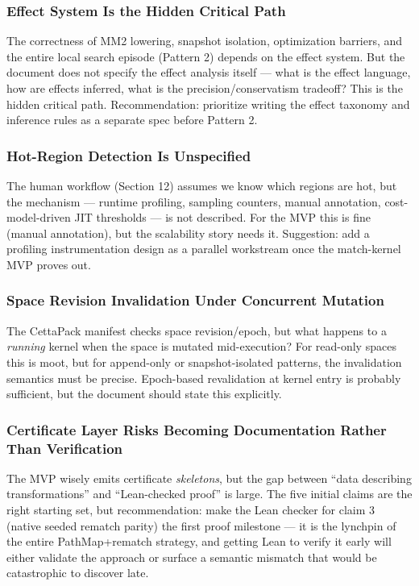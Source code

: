\documentclass[11pt]{article}
\begin{document}
\subsubsection{Effect System Is the Hidden Critical Path}

The correctness of MM2 lowering, snapshot isolation, optimization barriers, and the entire local search episode (Pattern 2) depends on the effect system. But the document does not specify the effect analysis itself --- what is the effect language, how are effects inferred, what is the precision/conservatism tradeoff? This is the hidden critical path. Recommendation: prioritize writing the effect taxonomy and inference rules as a separate spec before Pattern 2.

\subsubsection{Hot-Region Detection Is Unspecified}

The human workflow (Section 12) assumes we know which regions are hot, but the mechanism --- runtime profiling, sampling counters, manual annotation, cost-model-driven JIT thresholds --- is not described. For the MVP this is fine (manual annotation), but the scalability story needs it. Suggestion: add a profiling instrumentation design as a parallel workstream once the match-kernel MVP proves out.

\subsubsection{Space Revision Invalidation Under Concurrent Mutation}

The CettaPack manifest checks space revision/epoch, but what happens to a \textit{running} kernel when the space is mutated mid-execution? For read-only spaces this is moot, but for append-only or snapshot-isolated patterns, the invalidation semantics must be precise. Epoch-based revalidation at kernel entry is probably sufficient, but the document should state this explicitly.

\subsubsection{Certificate Layer Risks Becoming Documentation Rather Than Verification}

The MVP wisely emits certificate \textit{skeletons}, but the gap between ``data describing transformations'' and ``Lean-checked proof'' is large. The five initial claims are the right starting set, but recommendation: make the Lean checker for claim 3 (native seeded rematch parity) the first proof milestone --- it is the lynchpin of the entire PathMap+rematch strategy, and getting Lean to verify it early will either validate the approach or surface a semantic mismatch that would be catastrophic to discover late.
\end{document}
